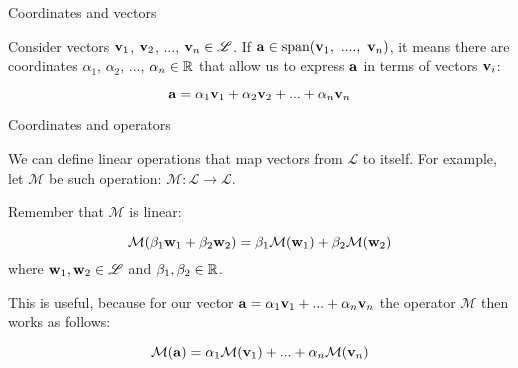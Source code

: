 \documentclass{beamer}
\begin{document}
\begin{frame}{Coordinates and vectors}
	\begin{flushleft}
		
		Consider vectors $\mathbf{v}_1$, $\mathbf{v}_2$, ..., $\mathbf{v}_n \in \mathscr{L}$. If $\bo{a} \in \text{span}(\bo{v}_1, \ ...., \ \bo{v}_n)$, it means there are coordinates $\alpha_1$, $\alpha_2$, ..., $\alpha_n \in \mathbb{R}$ that allow us to express $\mathbf{a}$ in terms of vectors $\mathbf{v}_i$:
		
		\begin{equation}
			\mathbf{a} = \alpha_1 \mathbf{v}_1 + \alpha_2 \mathbf{v}_2 + ... + \alpha_n \mathbf{v}_n 
		\end{equation}
		
		
		
	\end{flushleft}
\end{frame}



\begin{frame}{Coordinates and operators}
	\begin{flushleft}
		
		We can define linear operations that map vectors from $\mathscr{L}$ to itself. For example, let $\mathcal{M}$ be such operation: $\mathcal{M}: \mathscr{L} \rightarrow \mathscr{L}$.
		
		\bigskip
		
		Remember that $\mathcal{M}$ is linear:
		
		\begin{equation}
			\mathcal{M}(\beta_1 \mathbf{w}_1 + \beta_2 \mathbf{w}_2) = 
			\beta_1\mathcal{M}(\mathbf{w}_1) + 
			\beta_2\mathcal{M}(\mathbf{w}_2)
		\end{equation}
	where $\mathbf{w}_1, \mathbf{w}_2 \in \mathscr{L}$ and $\beta_1, \beta_2 \in \mathbb{R}$.
		
		\bigskip
		
		This is useful, because for our vector $\mathbf{a} = \alpha_1 \mathbf{v}_1 + ... + \alpha_n \mathbf{v}_n$ the operator $\mathcal{M}$ then works as follows:
		
		\begin{equation}
	\mathcal{M}(\mathbf{a}) = 
	\alpha_1 \mathcal{M}(\mathbf{v}_1) + ... + \alpha_n \mathcal{M}(\mathbf{v}_n)
\end{equation}		
		
		
		
	\end{flushleft}
\end{frame}
\end{document}
